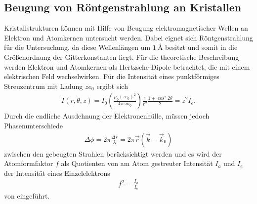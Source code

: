 \FloatBarrier

\subsection{Beugung von Röntgenstrahlung an Kristallen}
\label{subsec:Beugung}
Kristallstrukturen können mit Hilfe von Beugung
elektromagnetischer Wellen an Elektron und Atomkernen untersucht werden.
Dabei eignet sich Röntgenstrahlung für die Untersuchung, da diese Wellenlängen um
$\SI{1}{\angstrom}$ besitzt und somit in
die Größenordnung der Gitterkonstanten liegt.
Für die theoretische Beschreibung werden Elektron und Atomkernen
als Hertzsche-Dipole betrachtet, die mit einem
elektrischen Feld wechselwirken.
Für die Intensität eines punktförmiges Streuzentrum mit
Ladung $ze_0$ ergibt sich
\begin{align}
  I(r,\theta,z) = I_0\left(\frac{\mu_0 (ze_0)^2}{4\pi zm_0}\right)\frac{1}{r^2}\frac{1+\cos^2 2\theta}{2}=z^2 I_e \label{6}.
\end{align}
Durch die endliche Ausdehnung der Elektronenhülle,
müssen jedoch Phasenunterschiede
\begin{align*}
  \Delta\phi=2\pi\frac{\Delta s}{\lambda}= 2\pi\vec{r}\left(\vec{k}-\vec{k}_0\right)
\end{align*}
zwischen den gebeugten
Strahlen berücksichtigt werden und es wird
der Atomformfaktor $f$ als Quotienten
von am Atom gestreuter Intensität $I_a$ und $I_e$ der
Intensität eines Einzelelektrons
\begin{align}
f^2=\frac{I_a}{I_e}
\end{align}
von eingeführt.

